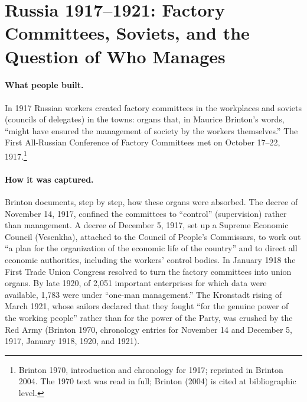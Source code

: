 \documentclass[10pt,twoside,openany]{book}
\theoremstyle{dpepstyle}
\begin{document}
\addtocounter{footnote}{-1}

\section{Russia 1917--1921: Factory Committees, Soviets, and the Question of Who Manages}
\label{sec:hist-russia}

\paragraph{What people built.} In 1917 Russian workers created factory committees in the workplaces and soviets (councils of delegates) in the towns: organs that, in Maurice Brinton's words, ``might have ensured the management of society by the workers themselves.'' The First All-Russian Conference of Factory Committees met on October 17--22, 1917.\footnote{Brinton 1970, introduction and chronology for 1917; reprinted in Brinton 2004. The 1970 text was read in full; Brinton (2004) is cited at bibliographic level.}

\paragraph{How it was captured.} Brinton documents, step by step, how these organs were absorbed. The decree of November 14, 1917, confined the committees to ``control'' (supervision) rather than management. A decree of December 5, 1917, set up a Supreme Economic Council (Vesenkha), attached to the Council of People's Commissars, to work out ``a plan for the organization of the economic life of the country'' and to direct all economic authorities, including the workers' control bodies. In January 1918 the First Trade Union Congress resolved to turn the factory committees into union organs. By late 1920, of 2,051 important enterprises for which data were available, 1,783 were under ``one-man management.'' The Kronstadt rising of March 1921, whose sailors declared that they fought ``for the genuine power of the working people'' rather than for the power of the Party, was crushed by the Red Army (Brinton 1970, chronology entries for November 14 and December 5, 1917, January 1918, 1920, and 1921).
\end{document}
